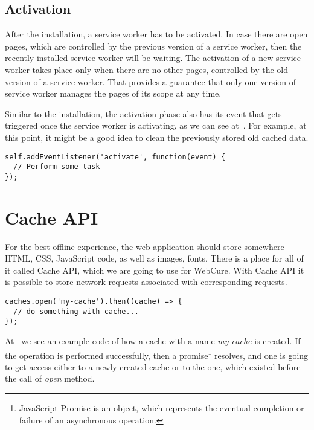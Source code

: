 \subsection*{Activation}

After the installation, a service worker has to be activated. In case there are open pages, which are controlled by the previous version of a service worker, then the recently installed service worker will be waiting. The activation of a new service worker takes place only when there are no other pages, controlled by the old version of a service worker. That provides a guarantee that only one version of service worker manages the pages of its scope at any time.

Similar to the installation, the activation phase also has its event that gets triggered once the service worker is activating, as we can see at~. For example, at this point, it might be a good idea to clean the previously stored old cached data.

\begin{lstlisting}[caption={[Code for listening to activation of a Service Worker]Code, which demonstrates a listener for the \textit{activation} service worker's event\cite{32}.}, label={lst:tech4}]
self.addEventListener('activate', function(event) {
  // Perform some task
});
\end{lstlisting}

\section{Cache API}
\label{CacheAPI}

For the best offline experience, the web application should store somewhere HTML, CSS, JavaScript code, as well as images, fonts. There is a place for all of it called Cache API, which we are going to use for WebCure. With Cache API it is possible to store network requests associated with corresponding requests.

\begin{lstlisting}[caption={[Code for creating cache storage using Cache API]Code, which demonstrates how one can create cache storage called \textit{my-cache}\cite{34}.}, label={lst:tech6}]
caches.open('my-cache').then((cache) => {
  // do something with cache...
});
\end{lstlisting}

At~ we see an example code of how a cache with a name \textit{my-cache} is created. If the operation is performed successfully, then a promise\footnote{JavaScript Promise is an object, which represents the eventual completion or failure of an asynchronous operation\cite{37}.} resolves, and one is going to get access either to a newly created cache or to the one, which existed before the call of \textit{open} method.

